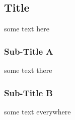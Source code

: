 \documentclass{article}
\begin{document}
\subsection*{Title}
some text here
\subsubsection*{Sub-Title A}
some text there
\subsubsection*{Sub-Title B}
some text everywhere
\end{document}
